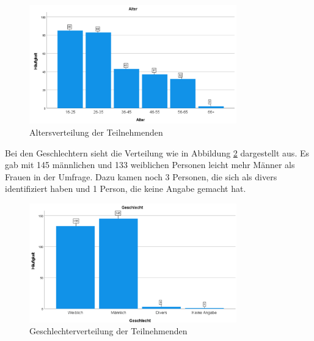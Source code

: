 \begin{figure}
    \centering
    \includegraphics[width=0.8\textwidth]{04_Artefakte/01_Abbildungen/deskriptiv_alter.png}
    \caption{Altersverteilung der Teilnehmenden}
    \label{fig:altersverteilung}
\end{figure}

Bei den Geschlechtern sieht die Verteilung wie in Abbildung \ref{fig:geschlechterverteilung} dargestellt aus. Es gab mit 145 männlichen und 133 weiblichen Personen leicht
mehr Männer als Frauen in der Umfrage. Dazu kamen noch 3 Personen, die sich als divers identifiziert haben und 1 Person, die keine Angabe gemacht hat.

\begin{figure}
    \centering
    \includegraphics[width=0.8\textwidth]{04_Artefakte/01_Abbildungen/deskriptiv_geschlecht.png}
    \caption{Geschlechterverteilung der Teilnehmenden}
    \label{fig:geschlechterverteilung}
\end{figure}


